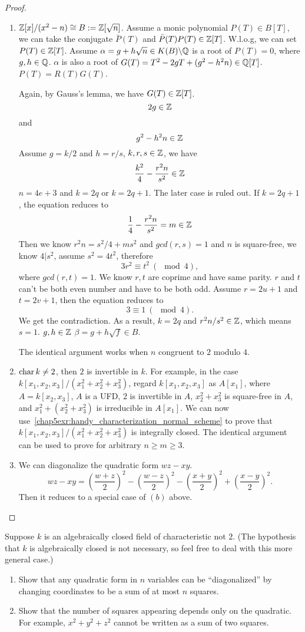 \documentclass[11pt,fleqn]{book} %
\begin{document}
\begin{proof}
\begin{enumerate}[label=(\alph*)]
\item $\mathbb Z[x]/(x^2-n)\cong B:=\mathbb Z[\sqrt{n}]$. Assume a monic polynomial $P(T)\in B[T]$, we can take the conjugate $\bar{P}(T)$ and $\bar{P}(T)P(T)\in \mathbb Z[T]$. W.l.o.g, we can set $P(T)\in \mathbb Z[T]$. Assume $\alpha=g+h\sqrt{n}\in K(B)\backslash \mathbb Q$ is a root of $P(T)=0$, where $g,h\in \mathbb Q$. $\alpha$ is also a root of $G(T)= T^2 - 2gT + (g^2 - h^2n) \in \mathbb Q[T]$. $P(T)=R(T)G(T)$.

Again, by Gauss's lemma, we have $G(T)\in \mathbb Z[T]$.
$$
2g\in \mathbb Z
$$
and
$$
g^2-h^2n\in \mathbb Z
$$
Assume $g=k/2$ and $h=r/s$, $k,r,s\in\mathbb Z$, we have
$$
\frac{k^2}{4}-\frac{r^2n}{s^2}\in \mathbb Z
$$
$n=4e+3$ and $k=2q$ or $k=2q+1$. The later case is ruled out. If $k=2q+1$,  the equation reduces to
$$
\frac{1}{4}-\frac{r^2n}{s^2}=m\in \mathbb Z
$$
Then we know $r^2 n=s^2/4 +ms^2$ and
$gcd(r,s)=1$ and $n$ is square-free, we know $4|s^2$, assume $s^2=4t^2$, therefore
$$
3r^2\equiv t^2\ (\mod 4), 
$$
where $gcd(r,t)=1$. We know $r,t$ are coprime and have same parity. $r$ and $t$ can't be both even number and have to be both odd. Assume $r=2u+1$ and $t=2v+1$, then the equation reduces to
$$
3\equiv 1\ (\mod 4).
$$
We get the contradiction. As a result, $k=2q$ and $r^2n/s^2\in\mathbb Z$, which means $s=1$. $g,h\in \mathbb Z$ $\beta=g+h\sqrt{f}\in B$.

The identical argument works when $n$ congruent to $2$ modulo $4$.

\item $\text{char\,} k\neq 2$, then $2$ is invertible in $k$. For example, in the case
$k[x_1,x_2,x_3]/(x_1^2+x_2^2+x_3^2)$, regard $k[x_1,x_2,x_3]$ as $A[x_1]$, where $A=k[x_2,x_3]$, $A$ is a UFD, $2$ is invertible in $A$, $x_2^2+x_3^2$ is square-free in $A$, and $x_1^2+(x_2^2+x_3^2)$ is irreducible in $A[x_1]$. We can now use~\ref{chap5exr:handy_characterization_normal_scheme} to prove that $k[x_1,x_2,x_3]/(x_1^2+x_2^2+x_3^2)$ is integrally closed. The identical argument can be used to prove for arbitrary $n\geq m\geq 3$.
\item We can diagonalize the quadratic form $wz-xy$.
$$
wz-xy=\left(\frac{w+z}{2}\right)^2-\left(\frac{w-z}{2}\right)^2-\left(\frac{x+y}{2}\right)^2+\left(\frac{x-y}{2}\right)^2.
$$
Then it reduces to a special case of $(b)$ above.

\end{enumerate}
\end{proof}
\begin{exr}
Suppose $k$ is an algebraically closed field of characteristic not $2$. (The hypothesis that $k$ is algebraically closed is not necessary, so feel free to deal with this more general case.)
\begin{enumerate}[label=(\alph*)]
\item Show that any quadratic form in $n$ variables can be ``diagonalized'' by changing coordinates to be a sum of at most $n$ squares.
\item Show that the number of squares appearing depends only on the quadratic. For example, $x^2 + y^2 + z^2$ cannot be written as a sum of two squares.
\end{enumerate}
\end{exr}
\end{document}
